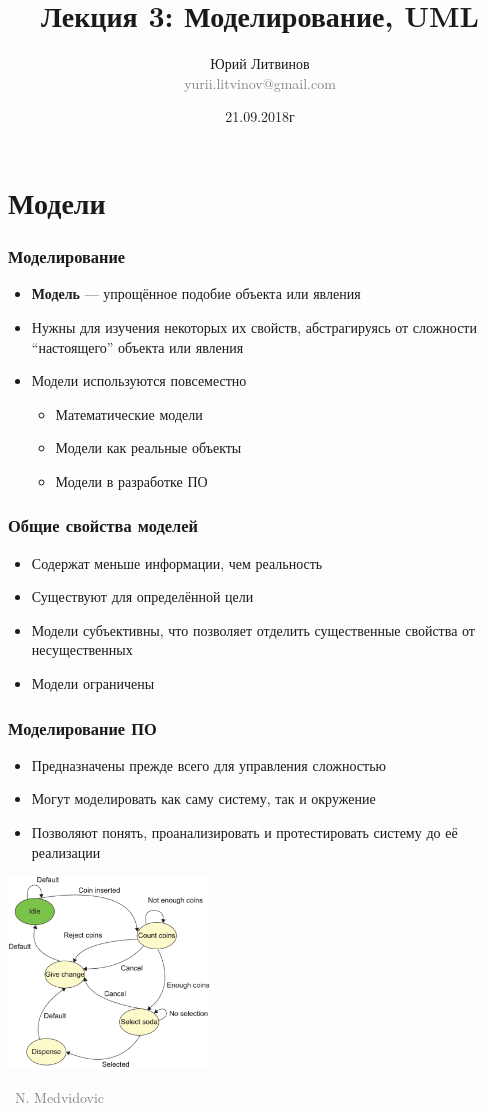 \documentclass[xetex,mathserif,serif]{beamer}
\title[Моделирование]{Лекция 3: Моделирование, UML}
\author[Юрий Литвинов]{Юрий Литвинов\\\small{\textcolor{gray}{yurii.litvinov@gmail.com}}}
\date{21.09.2018г}
\newcommand{\attribution}[1] {
	\vspace{-5mm}\begin{flushright}\begin{scriptsize}\textcolor{gray}{\textcopyright\, #1}\end{scriptsize}\end{flushright}
}
\begin{document}
	\frame{\titlepage}

	\section{Модели}

	\begin{frame}
		\frametitle{Моделирование}
		\begin{itemize}
			\item \textbf{Модель} --- упрощённое подобие объекта или явления
			\item Нужны для изучения некоторых их свойств, абстрагируясь от сложности ``настоящего'' объекта или явления
			\item Модели используются повсеместно
			\begin{itemize}
				\item Математические модели
				\item Модели как реальные объекты
				\item Модели в разработке ПО
			\end{itemize}
		\end{itemize}
	\end{frame}

	\begin{frame}
		\frametitle{Общие свойства моделей}
		\begin{itemize}
			\item Содержат меньше информации, чем реальность
			\item Существуют для определённой цели
			\item Модели субъективны, что позволяет отделить существенные свойства от несущественных
			\item Модели ограничены
		\end{itemize}

	\end{frame}

	\begin{frame}
		\frametitle{Моделирование ПО}
		\begin{itemize}
			\item Предназначены прежде всего для управления сложностью
			\item Могут моделировать как саму систему, так и окружение
			\item Позволяют понять, проанализировать и протестировать систему до её реализации
		\end{itemize}
		\begin{center}
			\includegraphics[width=0.4\textwidth]{vendingMachine.png}
			\attribution{N. Medvidovic}
		\end{center}
	\end{frame}
\end{document}
